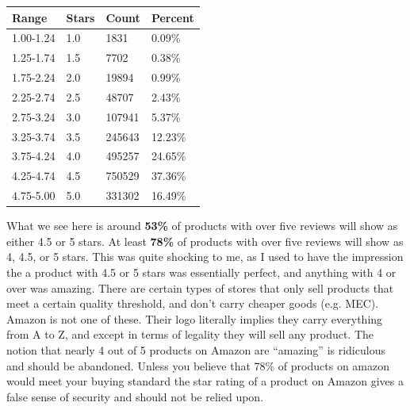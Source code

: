\documentclass[a4paper,11pt]{article}
\begin{document}
\begin{center}
    \begin{tabular}{l l l l}
    \textbf{Range} & \textbf{Stars} & \textbf{Count} & \textbf{Percent} \\
    \hline
    1.00-1.24 & 1.0 & 1831      & 0.09\% \\
    1.25-1.74 & 1.5 & 7702      & 0.38\% \\
    1.75-2.24 & 2.0 & 19894     & 0.99\% \\
    2.25-2.74 & 2.5 & 48707     & 2.43\% \\
    2.75-3.24 & 3.0 & 107941    & 5.37\% \\
    3.25-3.74 & 3.5 & 245643    & 12.23\% \\
    3.75-4.24 & 4.0 & 495257    & 24.65\% \\
    4.25-4.74 & 4.5 & 750529    & 37.36\% \\
    4.75-5.00 & 5.0 & 331302    & 16.49\% \\
    \end{tabular}
\end{center}
What we see here is around \textbf{53\%} of products with over five reviews will show as either 4.5 or 5 stars. At least \textbf{78\%} of products with over five reviews will show as 4, 4.5, or 5 stars. This was quite shocking to me, as I used to have the impression the a product with 4.5 or 5 stars was essentially perfect, and anything with 4 or over was amazing. There are certain types of stores that only sell products that meet a certain quality threshold, and don't carry cheaper goods (e.g. MEC). Amazon is not one of these. Their logo literally implies they carry everything from A to Z, and except in terms of legality they will sell any product. The notion that nearly 4 out of 5 products on Amazon are \enquote{amazing} is ridiculous and should be abandoned. Unless you believe that 78\% of products on amazon would meet your buying standard the star rating of a product on Amazon gives a false sense of security and should not be relied upon.
\end{document}
